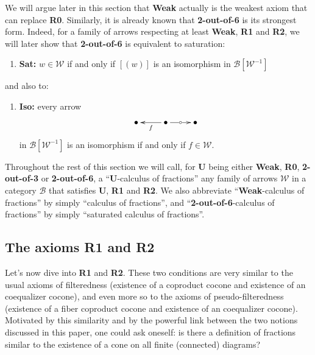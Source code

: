 \documentclass{article}
\numberwithin{equation}{section}
\theoremstyle{definition}
\theoremstyle{plain}
\begin{document}
We will argue later in this section that \textbf{Weak} actually is the weakest axiom that can replace \textbf{R0}. Similarly, it is already known that \textbf{2-out-of-6} is its strongest form. Indeed, for a family of arrows respecting at least \textbf{Weak}, \textbf{R1} and \textbf{R2}, we will later show that \textbf{2-out-of-6} is equivalent to saturation:
\begin{enumerate}[label = $\bullet$]
	\item \textbf{Sat:} $w \in \mathcal{W}$ if and only if $[(w)]$ is an isomorphism in $\mathcal{B}[\mathcal{W}^{-1}]$
\end{enumerate}
and also to:
\begin{enumerate}[label = $\bullet$]
	\item \textbf{Iso:} every arrow \[\xymatrix{ \bullet & \bullet \ar[r]|{\circ} \ar[l]^f & \bullet}\] in $\mathcal{B}[\mathcal{W}^{-1}]$ is an isomorphism if and only if $f \in \mathcal{W}$.
\end{enumerate}

Throughout the rest of this section we will call, for \textbf{U} being either \textbf{Weak}, \textbf{R0}, \textbf{2-out-of-3} or \textbf{2-out-of-6}, a ``\textbf{U}-calculus of fractions'' any family of arrows $\mathcal{W}$ in a category $\mathcal{B}$ that satisfies \textbf{U}, \textbf{R1} and \textbf{R2}. We also abbreviate ``\textbf{Weak}-calculus of fractions'' by simply ``calculus of fractions'', and ``\textbf{2-out-of-6}-calculus of fractions'' by simply ``saturated calculus of fractions''.

\subsection{The axioms \textbf{R1} and \textbf{R2}}

Let's now dive into \textbf{R1} and \textbf{R2}. These two conditions are very similar to the usual axioms of filteredness (existence of a coproduct cocone and existence of an coequalizer cocone), and even more so  to the axioms of pseudo-filteredness (existence of a fiber coproduct cocone and existence of an coequalizer cocone). Motivated by this similarity and by the powerful link between the two notions discussed in this paper, one could ask oneself: is there a definition of fractions similar to the existence of a cone on all finite (connected) diagrams?
\end{document}
